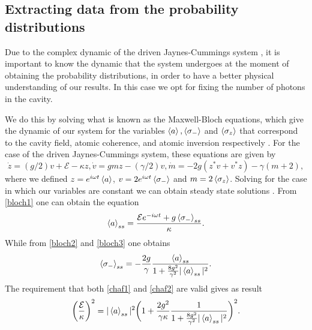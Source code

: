 \documentclass[conference]{IEEEtran}
\begin{document}
\subsection{Extracting data from the probability distributions}
Due to the complex dynamic of the driven Jaynes-Cummings system \cite{Carmichael1993Open}, it is important to know the dynamic that the system undergoes at the moment of obtaining the probability distributions, in order to have a better physical understanding of our results. In this case we opt for fixing the number of photons in the cavity.


We do this by solving what is known as the Maxwell-Bloch equations, which give the dynamic of our system for the variables  $\expval{a}, \expval{\sigma_-}$ and $\expval{\sigma_z}$ that correspond to the cavity field, atomic coherence, and atomic inversion respectively \cite{Alsing_1991}. For the case of the driven Jaynes-Cummings system, these equations are given by
\begin{subequations} \label{maxbloch}
\begin{equation} \label{bloch1}
\dot{z} = (g/2)v + \mathcal{E} - \kappa z,
\end{equation}
\begin{equation} \label{bloch2}
\dot{v} = gmz - (\gamma/2)v,
\end{equation}
\begin{equation} \label{bloch3}
\dot{m} = -2g(z^*v + v^*z) - \gamma(m + 2),
\end{equation}
\end{subequations} 
where we defined  $z = e^{i\omega t}\expval{a}$, $v = 2e^{i\omega t}\expval{\sigma_-}$ and $m = 2\expval{\sigma_z}$. Solving for the case in which our variables are constant we can obtain steady state solutions \cite{gagniuc2017markov}.  From \eqref{bloch1} one can obtain the equation
\begin{equation} \label{chaf1}
\expval{a}_{ss} = \frac{\mathcal{E}e^{-i\omega t} + g\expval{\sigma_-}_{ss}}{\kappa}.
\end{equation}
While from \eqref{bloch2} and \eqref{bloch3} one obtains
\begin{equation} \label{chaf2}
\expval{\sigma_-}_{ss} = -\frac{2g}{\gamma}\frac{\expval{a}_{ss}}{1 + \frac{8g^2}{\gamma^2}|\expval{a}_{ss}|^2}.
\end{equation}
The requirement that both \eqref{chaf1} and \eqref{chaf2} are valid gives as result
\begin{equation}
\bigg(\frac{\mathcal{E}}{\kappa}\bigg)^2 = |\expval{a}_{ss}|^2 \bigg(1 + \frac{2g^2}{\gamma \kappa}\frac{1}{1 + \frac{8g^2}{\gamma^2}|\expval{a}_{ss}|^2}\bigg)^2.
\end{equation}
\end{document}
